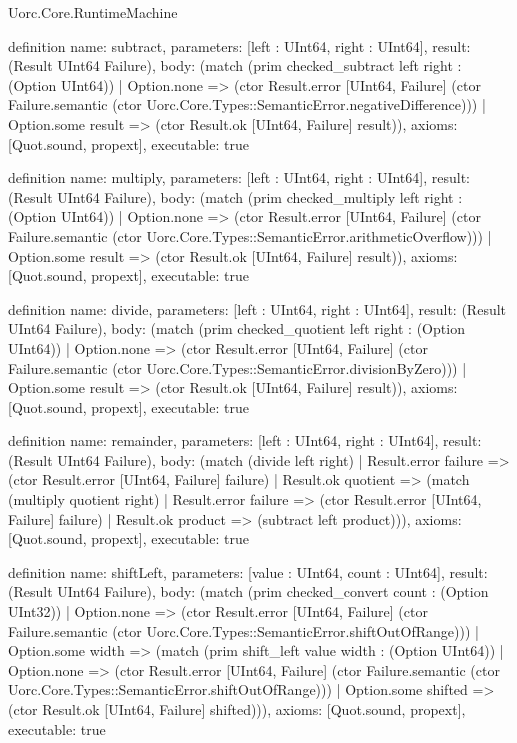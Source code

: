 \begin{lexlean}{Uorc.Core.RuntimeMachine}
\begin{semanticmodule}
definition{
  name: subtract,
  parameters: [left : UInt64, right : UInt64],
  result: (Result UInt64 Failure),
  body: (match (prim checked_subtract left right : (Option UInt64))
    | Option.none => (ctor Result.error [UInt64, Failure] (ctor Failure.semantic (ctor Uorc.Core.Types::SemanticError.negativeDifference)))
    | Option.some result => (ctor Result.ok [UInt64, Failure] result)),
  axioms: [Quot.sound, propext],
  executable: true
}

definition{
  name: multiply,
  parameters: [left : UInt64, right : UInt64],
  result: (Result UInt64 Failure),
  body: (match (prim checked_multiply left right : (Option UInt64))
    | Option.none => (ctor Result.error [UInt64, Failure] (ctor Failure.semantic (ctor Uorc.Core.Types::SemanticError.arithmeticOverflow)))
    | Option.some result => (ctor Result.ok [UInt64, Failure] result)),
  axioms: [Quot.sound, propext],
  executable: true
}

definition{
  name: divide,
  parameters: [left : UInt64, right : UInt64],
  result: (Result UInt64 Failure),
  body: (match (prim checked_quotient left right : (Option UInt64))
    | Option.none => (ctor Result.error [UInt64, Failure] (ctor Failure.semantic (ctor Uorc.Core.Types::SemanticError.divisionByZero)))
    | Option.some result => (ctor Result.ok [UInt64, Failure] result)),
  axioms: [Quot.sound, propext],
  executable: true
}

definition{
  name: remainder,
  parameters: [left : UInt64, right : UInt64],
  result: (Result UInt64 Failure),
  body: (match (divide left right)
    | Result.error failure => (ctor Result.error [UInt64, Failure] failure)
    | Result.ok quotient => (match (multiply quotient right)
      | Result.error failure => (ctor Result.error [UInt64, Failure] failure)
      | Result.ok product => (subtract left product))),
  axioms: [Quot.sound, propext],
  executable: true
}

definition{
  name: shiftLeft,
  parameters: [value : UInt64, count : UInt64],
  result: (Result UInt64 Failure),
  body: (match (prim checked_convert count : (Option UInt32))
    | Option.none => (ctor Result.error [UInt64, Failure] (ctor Failure.semantic (ctor Uorc.Core.Types::SemanticError.shiftOutOfRange)))
    | Option.some width => (match (prim shift_left value width : (Option UInt64))
      | Option.none => (ctor Result.error [UInt64, Failure] (ctor Failure.semantic (ctor Uorc.Core.Types::SemanticError.shiftOutOfRange)))
      | Option.some shifted => (ctor Result.ok [UInt64, Failure] shifted))),
  axioms: [Quot.sound, propext],
  executable: true
}


\end{semanticmodule}
\end{lexlean}
